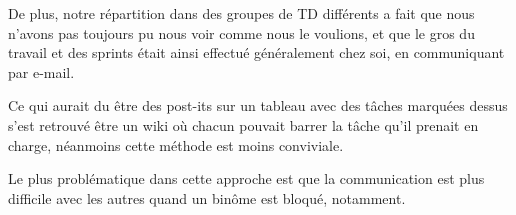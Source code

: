 De plus, notre répartition dans des groupes de TD différents a fait que nous n'avons pas toujours pu nous voir
comme nous le voulions, et que le gros du travail et des sprints était ainsi effectué généralement chez soi, en
communiquant par e-mail.

Ce qui aurait du être des post-its sur un tableau avec des tâches marquées dessus s'est retrouvé être un wiki
où chacun pouvait barrer la tâche qu'il prenait en charge, néanmoins cette méthode est moins conviviale.

Le plus problématique dans cette approche est que la communication est plus difficile avec les autres
quand un binôme est bloqué, notamment.
